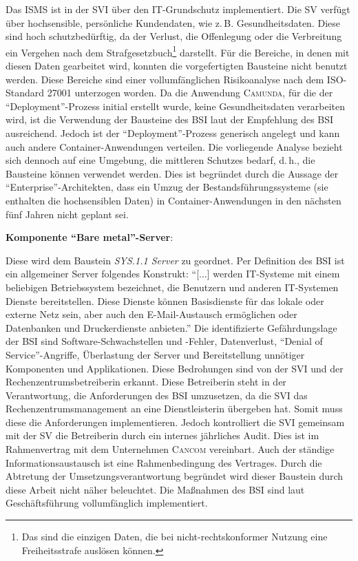 Das \ac{ISMS} ist in der \ac{SVI} über den IT-Grundschutz implementiert. Die \ac{SV} verfügt über hochsensible, persönliche Kundendaten, wie z.\,B. Gesundheitsdaten. Diese sind hoch schutzbedürftig, da der Verlust, die Offenlegung oder die Verbreitung ein Vergehen nach dem Strafgesetzbuch\footnote{Das sind die einzigen Daten, die bei nicht-rechtskonformer Nutzung eine Freiheitsstrafe auslösen können.} darstellt. Für die Bereiche, in denen mit diesen Daten gearbeitet wird, konnten die vorgefertigten Bausteine nicht benutzt werden. Diese Bereiche sind einer vollumfänglichen Risikoanalyse nach dem ISO-Standard 27001 unterzogen worden. Da die Anwendung \textsc{Camunda}, für die der \enquote{Deployment}-Prozess initial erstellt wurde, keine Gesundheitsdaten verarbeiten wird, ist die Verwendung der Bausteine des \ac{BSI} laut der Empfehlung des \ac{BSI} ausreichend. Jedoch ist der \enquote{Deployment}-Prozess generisch angelegt und kann auch andere Container-Anwendungen verteilen. Die vorliegende Analyse bezieht sich dennoch auf eine Umgebung, die mittleren Schutzes bedarf, d.\,h., die Bausteine können verwendet werden. Dies ist begründet durch die Aussage der \enquote{Enterprise}-Architekten, dass ein Umzug der Bestandsführungssysteme (sie enthalten die hochsensiblen Daten) in Container-Anwendungen in den nächsten fünf Jahren nicht geplant sei. 
\par
\textbf{Komponente \enquote{Bare metal}-Server}:\label{sec:bareMetalServer}
\par
Diese wird dem Baustein \textit{SYS.1.1 Server} zu geordnet. Per Definition des \ac{BSI} ist ein allgemeiner Server folgendes Konstrukt: \enquote{[...] werden IT-Systeme mit einem beliebigen Betriebssystem bezeichnet, die Benutzern und anderen IT-Systemen Dienste bereitstellen. Diese Dienste können Basisdienste für das lokale oder externe Netz sein, aber auch den E-Mail-Austausch ermöglichen oder Datenbanken und Druckerdienste anbieten.}\autocite[][S.\,461]{bundesamt_fur_sicherheit_in_der_informationstechnik_bsi_it-grundschutz-kompendium_2020} Die identifizierte Gefährdungslage der \ac{BSI} sind Software-Schwachstellen und -Fehler, Datenverlust, \enquote{Denial of Service}-Angriffe, Überlastung der Server und Bereitstellung unnötiger Komponenten und Applikationen.\autocite[vgl.][S.\,461-462]{bundesamt_fur_sicherheit_in_der_informationstechnik_bsi_it-grundschutz-kompendium_2020} Diese Bedrohungen sind von der \ac{SVI} und der Rechenzentrumsbetreiberin erkannt. Diese Betreiberin steht in der Verantwortung, die Anforderungen des \ac{BSI} umzusetzen, da die \ac{SVI} das Rechenzentrumsmanagement an eine Dienstleisterin übergeben hat. Somit muss diese die Anforderungen implementieren. Jedoch kontrolliert die \ac{SVI} gemeinsam mit der \ac{SV} die Betreiberin durch ein internes jährliches Audit. Dies ist im Rahmenvertrag mit dem Unternehmen \textsc{Cancom} vereinbart. Auch der ständige Informationsaustausch ist eine Rahmenbedingung des Vertrages. Durch die Abtretung der Umsetzungsverantwortung begründet wird dieser Baustein durch diese Arbeit nicht näher beleuchtet. Die Maßnahmen des \ac{BSI} sind laut Geschäftsführung vollumfänglich implementiert.
